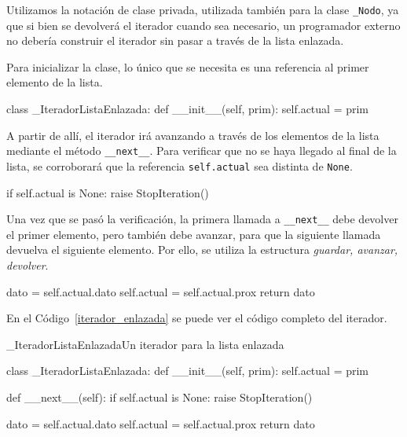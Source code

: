 \begin{atencion}
Utilizamos la notación de clase privada, utilizada también para la clase
\lstinline!_Nodo!, ya que si bien se devolverá el iterador cuando sea
necesario, un programador externo no debería construir el iterador sin
pasar a través de la lista enlazada.
\end{atencion}

Para inicializar la clase, lo único que se necesita es una referencia al
primer elemento de la lista.

\begin{codigo-python-sn}
class _IteradorListaEnlazada:
    def __init__(self, prim):
        self.actual = prim
\end{codigo-python-sn}

A partir de allí, el iterador irá avanzando a través de los elementos de la
lista mediante el método \lstinline!__next__!.  Para verificar que no se haya
llegado al final de la lista, se corroborará que la referencia
\lstinline!self.actual! sea distinta de \lstinline!None!.

\begin{codigo-python-sn}
if self.actual is None:
    raise StopIteration()
\end{codigo-python-sn}

Una vez que se pasó la verificación, la primera llamada a \lstinline!__next__!
debe devolver el primer elemento, pero también debe avanzar, para que la
siguiente llamada devuelva el siguiente elemento.  Por ello, se utiliza la
estructura \emph{guardar, avanzar, devolver}.

\begin{codigo-python-sn}
dato = self.actual.dato
self.actual = self.actual.prox
return dato
\end{codigo-python-sn}

En el Código~\ref{iterador_enlazada} se puede ver el código completo del
iterador.

\begin{codigo}{\_IteradorListaEnlazada}{Un iterador para la lista enlazada}
\label{iterador_enlazada}
\begin{codigo-python}
class _IteradorListaEnlazada:
    def __init__(self, prim):
        self.actual = prim

    def __next__(self):
        if self.actual is None:
            raise StopIteration()

        dato = self.actual.dato
        self.actual = self.actual.prox
        return dato
\end{codigo-python}
\end{codigo}


